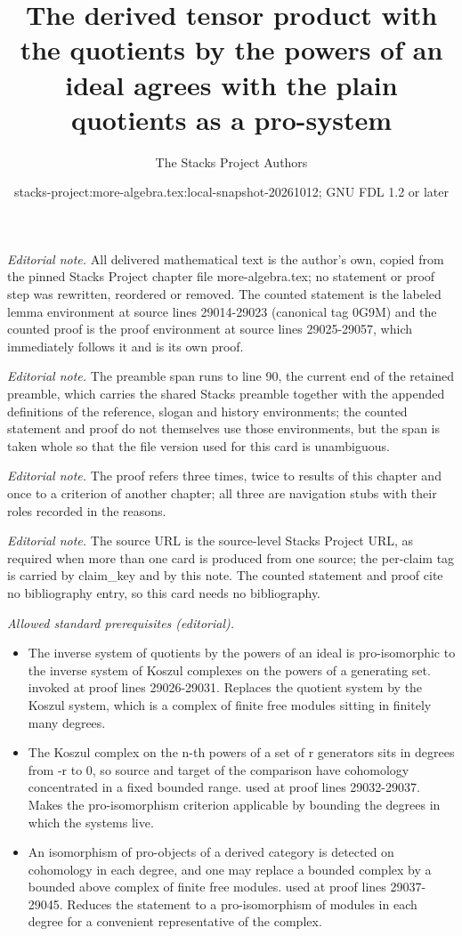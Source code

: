 \documentclass[10pt,a4paper]{amsart}
\title{The derived tensor product with the quotients by the powers of an ideal agrees with the plain quotients as a pro-system}
\author{The Stacks Project Authors}
\date{stacks-project:more-algebra.tex:local-snapshot-20261012; GNU FDL 1.2 or later}
\theoremstyle{plain}
\theoremstyle{definition}
\theoremstyle{remark}
\numberwithin{equation}{subsection}
\begin{document}
\maketitle
\setcounter{subsection}{1}
\noindent\textit{Editorial note.} All delivered mathematical text is the author's own, copied from the pinned Stacks Project chapter file more-algebra.tex; no statement or proof step was rewritten, reordered or removed. The counted statement is the labeled lemma environment at source lines 29014-29023 (canonical tag 0G9M) and the counted proof is the proof environment at source lines 29025-29057, which immediately follows it and is its own proof.\par\medskip
\noindent\textit{Editorial note.} The preamble span runs to line 90, the current end of the retained preamble, which carries the shared Stacks preamble together with the appended definitions of the reference, slogan and history environments; the counted statement and proof do not themselves use those environments, but the span is taken whole so that the file version used for this card is unambiguous.\par\medskip
\noindent\textit{Editorial note.} The proof refers three times, twice to results of this chapter and once to a criterion of another chapter; all three are navigation stubs with their roles recorded in the reasons.\par\medskip
\noindent\textit{Editorial note.} The source URL is the source-level Stacks Project URL, as required when more than one card is produced from one source; the per-claim tag is carried by claim\_key and by this note. The counted statement and proof cite no bibliography entry, so this card needs no bibliography.\par\medskip
\noindent\textit{Allowed standard prerequisites (editorial).}\begin{itemize}
\item The inverse system of quotients by the powers of an ideal is pro-isomorphic to the inverse system of Koszul complexes on the powers of a generating set. invoked at proof lines 29026-29031. Replaces the quotient system by the Koszul system, which is a complex of finite free modules sitting in finitely many degrees.
\item The Koszul complex on the n-th powers of a set of r generators sits in degrees from -r to 0, so source and target of the comparison have cohomology concentrated in a fixed bounded range. used at proof lines 29032-29037. Makes the pro-isomorphism criterion applicable by bounding the degrees in which the systems live.
\item An isomorphism of pro-objects of a derived category is detected on cohomology in each degree, and one may replace a bounded complex by a bounded above complex of finite free modules. used at proof lines 29037-29045. Reduces the statement to a pro-isomorphism of modules in each degree for a convenient representative of the complex.
\end{itemize}\medskip
\end{document}
